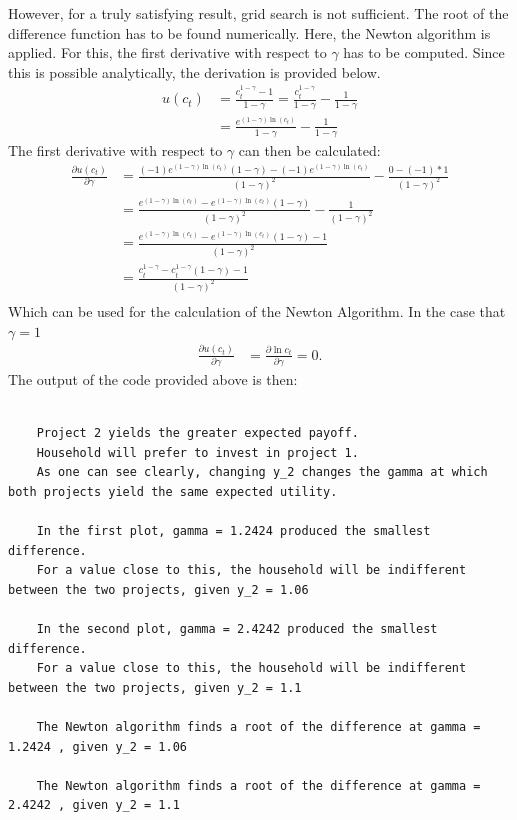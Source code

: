 \documentclass{article}
\begin{document}
\noindent However, for a truly satisfying result, grid search is not sufficient. The root of the difference function has to be found numerically. Here, the Newton algorithm is applied. For this, the first derivative with respect to $\gamma$ has to be computed. Since this is possible analytically, the derivation is provided below.
	\begin{align}
		u(c_t) &= \frac{c_t^{1-\gamma}-1}{1- \gamma} = \frac{c_t^{1-\gamma}}{1- \gamma} -\frac{1}{1- \gamma}\\
		&= \frac{e^{(1-\gamma) \ln (c_t)}}{1- \gamma} -\frac{1}{1- \gamma}
	\end{align}
	The first derivative with respect to $\gamma$ can then be calculated:
	\begin{align}
		\frac{ \partial u(c_t)}{\partial \gamma} &= \frac{(-1)e^{(1-\gamma) \ln (c_t)} (1- \gamma)- (-1)e^{(1-\gamma) \ln (c_t)}}{(1- \gamma)^2} - \frac{0 - (-1)*1}{(1- \gamma)^2} \\
		&= \frac{e^{(1-\gamma) \ln (c_t)}-e^{(1-\gamma) \ln (c_t)} (1- \gamma)}{(1- \gamma)^2} - \frac{1}{(1- \gamma)^2} \\
		&= \frac{e^{(1-\gamma) \ln (c_t)}-e^{(1-\gamma) \ln (c_t)} (1- \gamma)-1}{(1- \gamma)^2} \\
		&= \frac{c_t^{1- \gamma}-c_t^{1- \gamma} (1- \gamma)-1}{(1- \gamma)^2} \\  
	\end{align}
	Which can be used for the calculation of the Newton Algorithm.
	In the case that $ \gamma = 1 $
	\begin{align}\frac{ \partial u(c_t)}{\partial \gamma} &= \frac{ \partial \ln c_t}{\partial \gamma} = 0.
	\end{align}
	The output of the code provided above is then:
	\begin{lstlisting}[style=Matlab-editor]
	
	Project 2 yields the greater expected payoff.
	Household will prefer to invest in project 1.
	As one can see clearly, changing y_2 changes the gamma at which both projects yield the same expected utility.
	
	In the first plot, gamma = 1.2424 produced the smallest difference. 
	For a value close to this, the household will be indifferent between the two projects, given y_2 = 1.06 
	
	In the second plot, gamma = 2.4242 produced the smallest difference. 
	For a value close to this, the household will be indifferent between the two projects, given y_2 = 1.1 
	
	The Newton algorithm finds a root of the difference at gamma = 1.2424 , given y_2 = 1.06 
	
	The Newton algorithm finds a root of the difference at gamma = 2.4242 , given y_2 = 1.1 
	\end{lstlisting}
\end{document}
